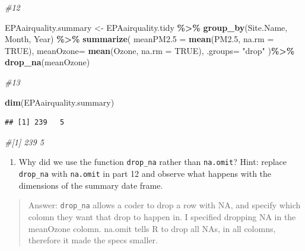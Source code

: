 \documentclass[
]{article}
\newenvironment{Shaded}{\begin{snugshade}}{\end{snugshade}}
\newcommand{\AttributeTok}[1]{\textcolor[rgb]{0.13,0.29,0.53}{#1}}
\newcommand{\CommentTok}[1]{\textcolor[rgb]{0.56,0.35,0.01}{\textit{#1}}}
\newcommand{\ConstantTok}[1]{\textcolor[rgb]{0.56,0.35,0.01}{#1}}
\newcommand{\FloatTok}[1]{\textcolor[rgb]{0.00,0.00,0.81}{#1}}
\newcommand{\FunctionTok}[1]{\textcolor[rgb]{0.13,0.29,0.53}{\textbf{#1}}}
\newcommand{\NormalTok}[1]{#1}
\newcommand{\OtherTok}[1]{\textcolor[rgb]{0.56,0.35,0.01}{#1}}
\newcommand{\SpecialCharTok}[1]{\textcolor[rgb]{0.81,0.36,0.00}{\textbf{#1}}}
\newcommand{\StringTok}[1]{\textcolor[rgb]{0.31,0.60,0.02}{#1}}
\providecommand{\tightlist}{%
  \setlength{\itemsep}{0pt}\setlength{\parskip}{0pt}}
\begin{document}
\begin{Shaded}
\begin{Highlighting}[]
\CommentTok{\#12}

\NormalTok{EPAairquality.summary }\OtherTok{\textless{}{-}}\NormalTok{ EPAairquality.tidy }\SpecialCharTok{\%\textgreater{}\%}
  \FunctionTok{group\_by}\NormalTok{(Site.Name, Month, Year) }\SpecialCharTok{\%\textgreater{}\%}
 \FunctionTok{summarize}\NormalTok{(}
 \AttributeTok{meanPM2.5 =} \FunctionTok{mean}\NormalTok{(PM2}\FloatTok{.5}\NormalTok{, }\AttributeTok{na.rm =} \ConstantTok{TRUE}\NormalTok{),}
 \AttributeTok{meanOzone=} \FunctionTok{mean}\NormalTok{(Ozone, }\AttributeTok{na.rm =} \ConstantTok{TRUE}\NormalTok{),}
  \AttributeTok{.groups=} \StringTok{"drop"} 
\NormalTok{  )}\SpecialCharTok{\%\textgreater{}\%}
\FunctionTok{drop\_na}\NormalTok{(meanOzone)}

\CommentTok{\#13}

\FunctionTok{dim}\NormalTok{(EPAairquality.summary)}
\end{Highlighting}
\end{Shaded}

\begin{verbatim}
## [1] 239   5
\end{verbatim}

\begin{Shaded}
\begin{Highlighting}[]
\CommentTok{\#[1] 239   5}
\end{Highlighting}
\end{Shaded}

\begin{enumerate}
\def\labelenumi{\arabic{enumi}.}
\setcounter{enumi}{13}
\tightlist
\item
  Why did we use the function \texttt{drop\_na} rather than
  \texttt{na.omit}? Hint: replace \texttt{drop\_na} with
  \texttt{na.omit} in part 12 and observe what happens with the
  dimensions of the summary date frame.
\end{enumerate}

\begin{quote}
Answer: \texttt{drop\_na} allows a coder to drop a row with NA, and
specify which colomn they want that drop to happen in. I specified
dropping NA in the meanOzone colomn. na.omit tells R to drop all NAs, in
all colomns, therefore it made the specs smaller.
\end{quote}
\end{document}
